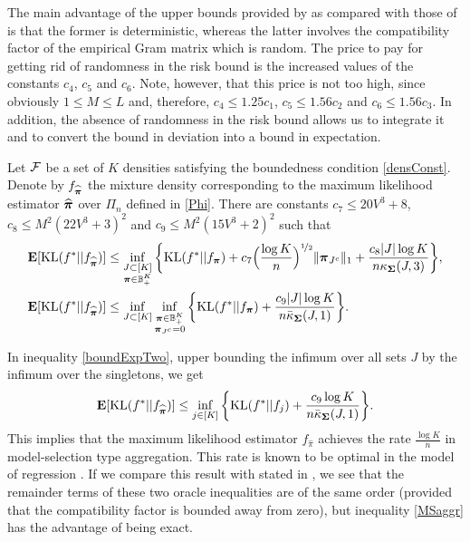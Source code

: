 The main advantage of the upper bounds provided by  as compared with those of
 is that the former is deterministic, whereas the latter involves the
compatibility factor of the empirical Gram matrix which is random. The price to pay for getting
rid of randomness in the risk bound is the increased values of the constants $c_4$, $c_5$ and $c_6$.
Note, however, that this price is not too high, since obviously $1\le M\le L$ and, therefore,
$c_4\le 1.25 c_1$, $c_5\le 1.56 c_2$ and $c_6\le 1.56 c_3$. In addition, the absence of randomness
in the risk bound allows us to integrate it and to convert the bound in deviation into a bound
in expectation.

\begin{theorem}
	\label{th:expectation}
	Let $\cal F$ be a set of $K$ densities satisfying the boundedness condition \eqref{densConst}.
	Denote by $f_{\widehat{\boldsymbol \pi}}$ the mixture density corresponding to the maximum likelihood estimator
	$\widehat{\boldsymbol \pi}$ over $\Pi_n$ defined in \eqref{Phi}. There are constants $c_7\le 20V^3 + 8$,
	$c_8\le M^2(22V^3+3)^2$ and $c_9\le M^2(15V^3+2)^2$ such that
	\begin{align}
	\mathbf E[{\rm KL}(f^*|| f_{\widehat{\boldsymbol \pi}})] &\leq \inf_{\substack{J\subset [K]\\ \boldsymbol \pi \in {\mathbb B}_+^K}}
	\bigg\{ {\rm KL}(f^*|| f_{\boldsymbol \pi}) + c_7\Big(\frac{\log K}{n}\Big)^{\nicefrac12} \|\boldsymbol \pi_{J^c}\|_1 +
	\frac{c_8|J|\log K}{n\kappa_{\boldsymbol\Sigma}(J,3)} \bigg\},\label{boundExpOne}\\
	\mathbf E[{\rm KL}(f^*|| f_{\widehat{\boldsymbol \pi}})] &\leq \inf_{J\subset [K]}\inf_{\substack{\boldsymbol \pi \in {\mathbb B}_+^K\\
			\boldsymbol \pi_{J^c}=0}} \bigg\{ {\rm KL}(f^*|| f_{\boldsymbol \pi}) +
	\frac{c_9|J|\log K}{n\bar\kappa_{\boldsymbol\Sigma}(J,1)} \bigg\}.\label{boundExpTwo}
	\end{align}
\end{theorem}

In inequality \eqref{boundExpTwo}, upper bounding the infimum over all sets $J$ by the infimum
over the singletons, we get
\begin{equation}
\mathbf E[{\rm KL}(f^*|| f_{\widehat{\boldsymbol \pi}})] \leq \inf_{j\in [K]}\bigg\{ {\rm KL}(f^*|| f_j) +
\frac{c_9\log K}{n\bar\kappa_{\boldsymbol\Sigma}(J,1)} \bigg\}.\label{MSaggr}
\end{equation}
This implies that the maximum likelihood estimator $f_{\hat\pi}$ achieves the
rate $\frac{\log K}{n}$ in model-selection type aggregation. This rate is known
to be optimal in the model of regression \citep{Rigollet12}. If we compare this result
with  stated in , we see that the remainder terms
of these two oracle inequalities are of the same order (provided that the compatibility
factor is bounded away from zero), but inequality \eqref{MSaggr} has the advantage
of being exact.

